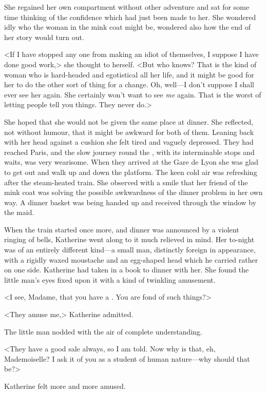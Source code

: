 She regained her own compartment without other adventure and sat for some time thinking of the confidence which had just been made to her. She wondered idly who the woman in the mink coat might be, wondered also how the end of her story would turn out.

<If I have stopped any one from making an idiot of themselves, I suppose I have done good work,> she thought to herself. <But who knows? That is the kind of woman who is hard-headed and egotistical all her life, and it might be good for her to do the other sort of thing for a change. Oh, well—I don't suppose I shall ever see her again. She certainly won't want to see \emph{me} again. That is the worst of letting people tell you things. They never do.>

She hoped that she would not be given the same place at dinner. She reflected, not without humour, that it might be awkward for both of them. Leaning back with her head against a cushion she felt tired and vaguely depressed. They had reached Paris, and the slow journey round the , with its interminable stops and waits, was very wearisome. When they arrived at the Gare de Lyon she was glad to get out and walk up and down the platform. The keen cold air was refreshing after the steam-heated train. She observed with a smile that her friend of the mink coat was solving the possible awkwardness of the dinner problem in her own way. A dinner basket was being handed up and received through the window by the maid.

When the train started once more, and dinner was announced by a violent ringing of bells, Katherine went along to it much relieved in mind. Her  to-night was of an entirely different kind—a small man, distinctly foreign in appearance, with a rigidly waxed moustache and an egg-shaped head which he carried rather on one side. Katherine had taken in a book to dinner with her. She found the little man's eyes fixed upon it with a kind of twinkling amusement.

<I see, Madame, that you have a . You are fond of such things?>

<They amuse me,> Katherine admitted.

The little man nodded with the air of complete understanding.

<They have a good sale always, so I am told. Now why is that, eh, Mademoiselle? I ask it of you as a student of human nature—why should that be?>

Katherine felt more and more amused.

